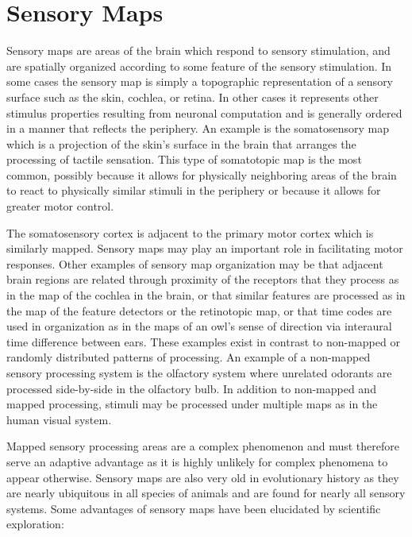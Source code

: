 \hypertarget{sensory-maps}{%
\section{Sensory Maps}\label{sensory-maps}}

Sensory maps are areas of the brain which respond to sensory stimulation, and are spatially organized according to some feature of the sensory stimulation. In some cases the sensory map is simply a topographic representation of a sensory surface such as the skin, cochlea, or retina. In other cases it represents other stimulus properties resulting from neuronal computation and is generally ordered in a manner that reflects the periphery. An example is the somatosensory map which is a projection of the skin's surface in the brain that arranges the processing of tactile sensation. This type of somatotopic map is the most common, possibly because it allows for physically neighboring areas of the brain to react to physically similar stimuli in the periphery or because it allows for greater motor control.

The somatosensory cortex is adjacent to the primary motor cortex which is similarly mapped. Sensory maps may play an important role in facilitating motor responses. Other examples of sensory map organization may be that adjacent brain regions are related through proximity of the receptors that they process as in the map of the cochlea in the brain, or that similar features are processed as in the map of the feature detectors or the retinotopic map, or that time codes are used in organization as in the maps of an owl's sense of direction via interaural time difference between ears. These examples exist in contrast to non-mapped or randomly distributed patterns of processing. An example of a non-mapped sensory processing system is the olfactory system where unrelated odorants are processed side-by-side in the olfactory bulb. In addition to non-mapped and mapped processing, stimuli may be processed under multiple maps as in the human visual system.

Mapped sensory processing areas are a complex phenomenon and must therefore serve an adaptive advantage as it is highly unlikely for complex phenomena to appear otherwise. Sensory maps are also very old in evolutionary history as they are nearly ubiquitous in all species of animals and are found for nearly all sensory systems. Some advantages of sensory maps have been elucidated by scientific exploration:

